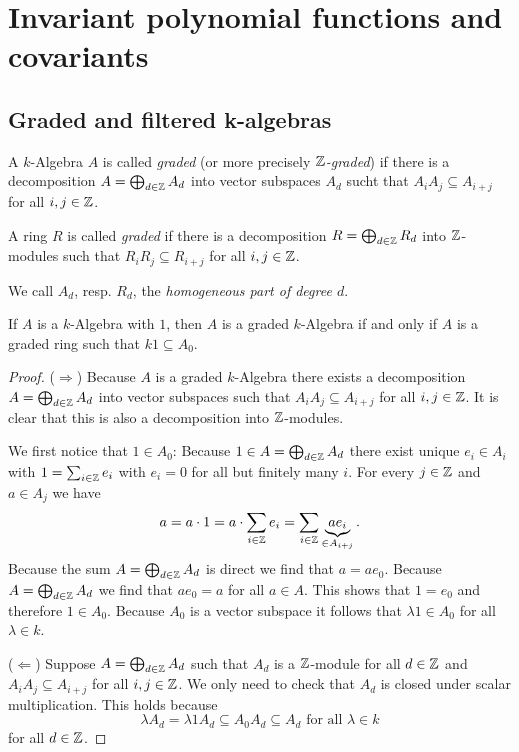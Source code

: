 \chapter{Invariant polynomial functions and covariants}





\section{Graded and filtered k-algebras}


\begin{defi}
 A $k$-Algebra $A$ is called \emph{graded} (or more precisely \emph{$\mathbb{Z}$-graded}) if there is a decomposition $A = \bigoplus_{d \in \mathbb{Z}} A_d$ into vector subspaces $A_d$ sucht that $A_i A_j \subseteq A_{i+j}$ for all $i,j \in \mathbb{Z}$.
 
 A ring $R$ is called \emph{graded} if there is a decomposition $R = \bigoplus_{d \in \mathbb{Z}} R_d$ into $\mathbb{Z}$-modules such that $R_i R_j \subseteq R_{i+j}$ for all $i,j \in \mathbb{Z}$.
 
 We call $A_d$, resp. $R_d$, the \emph{homogeneous part of degree $d$}.
\end{defi}

\begin{rem}
 If $A$ is a $k$-Algebra with $1$, then $A$ is a graded $k$-Algebra if and only if $A$ is a graded ring such that $k1 \subseteq A_0$.
\end{rem}
\begin{proof}
 ($\Rightarrow$) Because $A$ is a graded $k$-Algebra there exists a decomposition $A = \bigoplus_{d \in \mathbb{Z}} A_d$ into vector subspaces such that $A_i A_j \subseteq A_{i+j}$ for all $i,j \in \mathbb{Z}$. It is clear that this is also a decomposition into $\mathbb{Z}$-modules.
 
 We first notice that $1 \in A_0$: Because $1 \in A = \bigoplus_{d \in \mathbb{Z}} A_d$ there exist unique $e_i \in A_i$ with $1 = \sum_{i \in \mathbb{Z}} e_i$ with $e_i = 0$ for all but finitely many $i$. For every $j \in \mathbb{Z}$ and $a \in A_j$ we have
 \[
  a = a \cdot 1 = a \cdot \sum_{i \in \mathbb{Z}} e_i = \sum_{i \in \mathbb{Z}} \underbrace{a e_i}_{\in A_{i+j}}.
 \]
 Because the sum $A = \bigoplus_{d \in \mathbb{Z}} A_d$ is direct we find that $a = a e_0$. Because $A = \bigoplus_{d \in \mathbb{Z}} A_d$ we find that $a e_0 = a$ for all $a \in A$. This shows that $1 = e_0$ and therefore $1 \in A_0$. Because $A_0$ is a vector subspace it follows that $\lambda 1 \in A_0$ for all $\lambda \in k$.
 
 ($\Leftarrow$) Suppose $A = \bigoplus_{d \in \mathbb{Z}} A_d$ such that $A_d$ is a $\mathbb{Z}$-module for all $d \in \mathbb{Z}$ and $A_i A_j \subseteq A_{i+j}$ for all $i,j \in \mathbb{Z}$. We only need to check that $A_d$ is closed under scalar multiplication. This holds because
 \[
  \lambda A_d = \lambda 1 A_d \subseteq A_0 A_d \subseteq A_d \text{ for all } \lambda \in k
 \]
 for all $d \in \mathbb{Z}$.
\end{proof}


